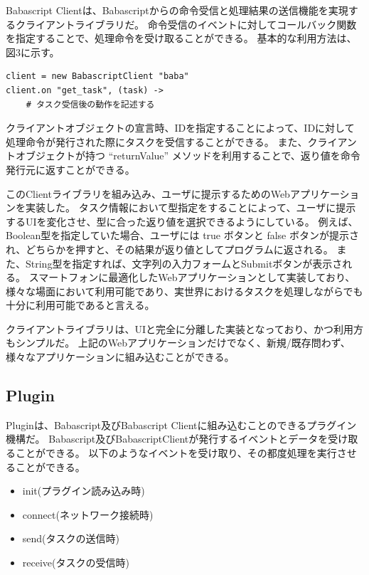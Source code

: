 Babascript
Clientは、Babascriptからの命令受信と処理結果の送信機能を実現するクライアントライブラリだ。
命令受信のイベントに対してコールバック関数を指定することで、処理命令を受け取ることができる。
基本的な利用方法は、図3に示す。

\begin{verbatim}
client = new BabascriptClient "baba"
client.on "get_task", (task) ->
    # タスク受信後の動作を記述する
\end{verbatim}

クライアントオブジェクトの宣言時、IDを指定することによって、IDに対して処理命令が発行された際にタスクを受信することができる。
また、クライアントオブジェクトが持つ ``returnValue''
メソッドを利用することで、返り値を命令発行元に返すことができる。

このClientライブラリを組み込み、ユーザに提示するためのWebアプリケーションを実装した。
タスク情報において型指定をすることによって、ユーザに提示するUIを変化させ、型に合った返り値を選択できるようにしている。
例えば、Boolean型を指定していた場合、ユーザには true ボタンと false
ボタンが提示され、どちらかを押すと、その結果が返り値としてプログラムに返される。
また、String型を指定すれば、文字列の入力フォームとSubmitボタンが表示される。
スマートフォンに最適化したWebアプリケーションとして実装しており、様々な場面において利用可能であり、実世界におけるタスクを処理しながらでも十分に利用可能であると言える。

クライアントライブラリは、UIと完全に分離した実装となっており、かつ利用方もシンプルだ。
上記のWebアプリケーションだけでなく、新規/既存問わず、様々なアプリケーションに組み込むことができる。

\subsection{Plugin}\label{plugin}

Pluginは、Babascript及びBabascript
Clientに組み込むことのできるプラグイン機構だ。
Babascript及びBabascriptClientが発行するイベントとデータを受け取ることができる。
以下のようなイベントを受け取り、その都度処理を実行させることができる。

\begin{itemize}
\itemsep1pt\parskip0pt
\item
  init(プラグイン読み込み時)
\item
  connect(ネットワーク接続時)
\item
  send(タスクの送信時)
\item
  receive(タスクの受信時)
\end{itemize}

